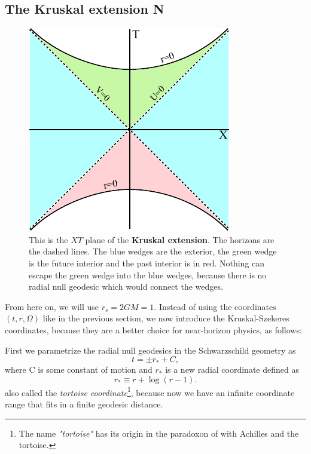 \subsection{The Kruskal extension \textbf{N}}
		\begin{figure}[htbp]
			\begin{center}
				\includegraphics[scale=1]{kruskal}
			\end{center}
			\caption{This is the $XT$ plane of the \textbf{Kruskal extension}. The horizons are the dashed lines. The blue wedges are the exterior, the green wedge is the future interior and the past interior is in red. Nothing can escape the green wedge into the blue wedges, because there is no radial null geodesic which would connect the wedges.}\label{kruskal}	
		\end{figure}
	From here on, we will use $r_{s}=2GM=1$.
	Instead of using the coordinates $(t,r,\Omega)$ like in the previous section, we now introduce the Kruskal-Szekeres coordinates, because they are a better choice for near-horizon physics, as follows:
	
	First we parametrize the radial null geodesics in the Schwarzschild geometry as
		\begin{equation}
			t=\pm r_{*} + C,
		\end{equation}
	where C is some constant of motion and $r_{*}$ is a new radial coordinate defined as
		\begin{equation} \label{r_*tortoise}
			r_{*}\equiv r+\log (r-1).
		\end{equation}
	also called the \textit{tortoise coordinate}\footnote{The name \textit{"tortoise"} has its origin in the paradoxon of with Achilles and the tortoise.}, because now we have an infinite coordinate range that fits in a finite geodesic distance.
		
